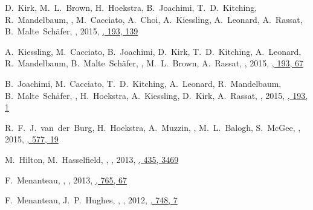 \item
D.~Kirk, M.~L.~Brown, H.~Hoekstra, B.~Joachimi, T.~D.~Kitching, R.~Mandelbaum, 
\myself, M.~Cacciato, A.~Choi, A.~Kiessling, A.~Leonard, A.~Rassat, 
B.~Malte~Sch\"afer,
,
2015, \href{https://ui.adsabs.harvard.edu/abs/2015SSRv..193..139K/abstract}{\ssr, 193, 139}

\item
A.~Kiessling, M.~Cacciato, B.~Joachimi, D.~Kirk, T.~D.~Kitching, A.~Leonard, 
R.~Mandelbaum, B.~Malte~Sch\"afer, \myself, M.~L.~Brown, A.~Rassat,
,
2015, \href{https://ui.adsabs.harvard.edu/abs/2015SSRv..193...67K/abstract}{\ssr, 193, 67}

\item
B.~Joachimi, M.~Cacciato, T.~D.~Kitching, A.~Leonard, R.~Mandelbaum, 
B.~Malte~Sch\"afer, \myself, H.~Hoekstra, A.~Kiessling, D.~Kirk, A.~Rassat,
,
2015, \href{https://ui.adsabs.harvard.edu/abs/2015SSRv..193....1J/abstract}{\ssr, 193, 1}

\item
R.~F.~J.~van~der~Burg, H.~Hoekstra, A.~Muzzin, \myself, M.~L.~Balogh, S.~McGee,
,
2015, \href{https://ui.adsabs.harvard.edu/abs/2015A&A...577A..19V}{\aap, 577, 19}

\item
M.~Hilton, M.~Hasselfield, \myself, 
,
2013, \href{https://ui.adsabs.harvard.edu/abs/2013MNRAS.435.3469H/abstract}{\mnras, 435, 3469}

\item
F.~Menanteau, \myself, 
,
2013, \href{https://ui.adsabs.harvard.edu/abs/2013ApJ...765...67M/abstract}{\apj, 765, 67}

\item
F.~Menanteau, J.~P.~Hughes, \myself, 
,
2012, \href{https://ui.adsabs.harvard.edu/abs/2012ApJ...748....7M/abstract}{\apj, 748, 7}

